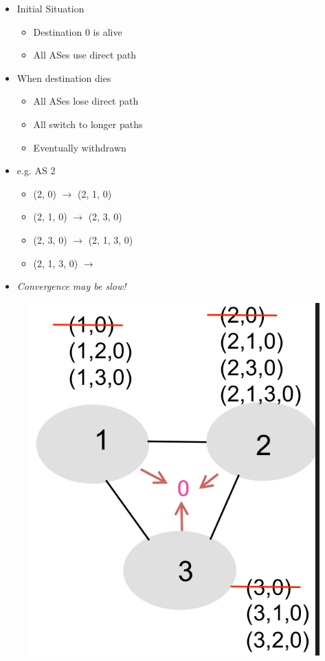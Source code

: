 \begin{itemize}[nosep]
    \item Initial Situation
          \begin{itemize}[nosep]
              \item Destination 0 is alive
              \item All ASes use direct path
          \end{itemize}
    \item When destination dies
          \begin{itemize}[nosep]
              \item All ASes lose direct path
              \item All switch to longer paths
              \item Eventually withdrawn
          \end{itemize}
    \item e.g. AS 2
          \begin{itemize}[nosep]
              \item (2, 0) $\rightarrow$ (2, 1, 0)
              \item (2, 1, 0) $\rightarrow$ (2, 3, 0)
              \item (2, 3, 0) $\rightarrow$ (2, 1, 3, 0)
              \item (2, 1, 3, 0) $\rightarrow$ \Null
          \end{itemize}
    \item \emph{Convergence may be slow!}
\end{itemize}
\begin{figure}[H]
    \includegraphics[scale=0.25]{lazy/routingpathexploration2.png}
\end{figure}


